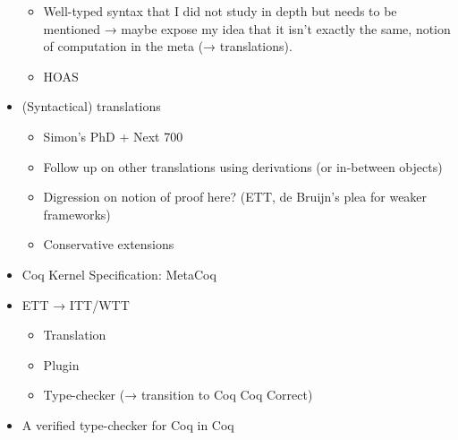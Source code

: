 \begin{itemize}
\begin{itemize}
      \item Well-typed syntax that I did not study in depth but needs to be
      mentioned → maybe expose my idea that it isn't exactly the same,
      notion of computation in the meta (→ translations).
      \item HOAS
    \end{itemize}
  \item (Syntactical) translations
    \begin{itemize}
      \item Simon's PhD + Next 700
      \item Follow up on other translations using derivations (or in-between
      objects)
      \item Digression on notion of proof here? (ETT, de Bruijn's plea for
      weaker frameworks)
      \item Conservative extensions
    \end{itemize}
  \item Coq Kernel Specification: MetaCoq
  \item ETT → ITT/WTT
    \begin{itemize}
      \item Translation
      \item Plugin
      \item Type-checker (→ transition to Coq Coq Correct)
    \end{itemize}
  \item A verified type-checker for Coq in Coq
\end{itemize}